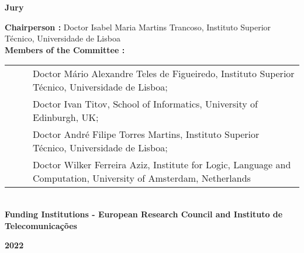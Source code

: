 \begin{flushleft}
    \large \textbf{Jury}\\
    \vspace{3mm}
    \raggedright\large \textbf{Chairperson :} Doctor Isabel Maria Martins Trancoso, Instituto Superior Técnico, Universidade de Lisboa\\
    \vspace{3mm}
    \large \textbf{Members of the Committee :}\\ %
    \vspace{3mm}
    \begin{minipage}{\textwidth}
        \begin{tabularx}{1.1\textwidth}{ l @{ } p{} }
            ~~~ & Doctor Mário Alexandre Teles de Figueiredo, Instituto Superior Técnico, Universidade de Lisboa;                  \\
                & Doctor Ivan Titov, School of Informatics, University of Edinburgh, UK;                                           \\
                & Doctor André Filipe Torres Martins, Instituto Superior Técnico, Universidade de Lisboa;                          \\
                & Doctor Wilker Ferreira Aziz, Institute for Logic, Language and Computation, University of Amsterdam, Netherlands \\
        \end{tabularx}
    \end{minipage}\\
    \centering
    \vspace{5mm}\large \textbf{Funding Institutions - European Research Council and Instituto de Telecomunicações}\\
    \vspace{10mm}

    \large \textbf{2022} \\
    \let\thepage\relax
\end{flushleft}
\pagebreak
